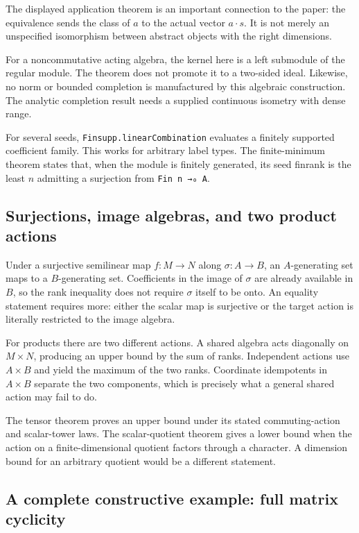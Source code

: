 \documentclass[11pt,a4paper]{article}
\newcommand{\code}[1]{\nolinkurl{#1}}
\begin{document}
The displayed application theorem is an important connection to the paper: the equivalence sends the class of $a$ to the actual vector $a\cdot s$. It is not merely an unspecified isomorphism between abstract objects with the right dimensions.

For a noncommutative acting algebra, the kernel here is a left submodule of the regular module. The theorem does not promote it to a two-sided ideal. Likewise, no norm or bounded completion is manufactured by this algebraic construction. The analytic completion result needs a supplied continuous isometry with dense range.

For several seeds, \code{Finsupp.linearCombination} evaluates a finitely supported coefficient family. This works for arbitrary label types. The finite-minimum theorem states that, when the module is finitely generated, its seed finrank is the least $n$ admitting a surjection from \code{Fin n →₀ A}.

\subsection{Surjections, image algebras, and two product actions}

Under a surjective semilinear map $f:M\to N$ along $\sigma:A\to B$, an $A$-generating set maps to a $B$-generating set. Coefficients in the image of $\sigma$ are already available in $B$, so the rank inequality does not require $\sigma$ itself to be onto. An equality statement requires more: either the scalar map is surjective or the target action is literally restricted to the image algebra.

For products there are two different actions. A shared algebra acts diagonally on $M\times N$, producing an upper bound by the sum of ranks. Independent actions use $A\times B$ and yield the maximum of the two ranks. Coordinate idempotents in $A\times B$ separate the two components, which is precisely what a general shared action may fail to do.

The tensor theorem proves an upper bound under its stated commuting-action and scalar-tower laws. The scalar-quotient theorem gives a lower bound when the action on a finite-dimensional quotient factors through a character. A dimension bound for an arbitrary quotient would be a different statement.

\subsection{A complete constructive example: full matrix cyclicity}
\end{document}
